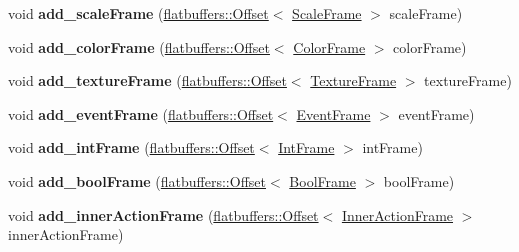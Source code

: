 \begin{DoxyCompactItemize}
\item 
\mbox{\label{structflatbuffers_1_1FrameBuilder_ac62911862ae54604654259b250f62d61}} 
void {\bfseries add\+\_\+scale\+Frame} (\hyperlink{structflatbuffers_1_1Offset}{flatbuffers\+::\+Offset}$<$ \hyperlink{structflatbuffers_1_1ScaleFrame}{Scale\+Frame} $>$ scale\+Frame)
\item 
\mbox{\label{structflatbuffers_1_1FrameBuilder_a201a2fce6152ac142266550904845393}} 
void {\bfseries add\+\_\+color\+Frame} (\hyperlink{structflatbuffers_1_1Offset}{flatbuffers\+::\+Offset}$<$ \hyperlink{structflatbuffers_1_1ColorFrame}{Color\+Frame} $>$ color\+Frame)
\item 
\mbox{\label{structflatbuffers_1_1FrameBuilder_aaef0b8db77626281801f505ec566a8c8}} 
void {\bfseries add\+\_\+texture\+Frame} (\hyperlink{structflatbuffers_1_1Offset}{flatbuffers\+::\+Offset}$<$ \hyperlink{structflatbuffers_1_1TextureFrame}{Texture\+Frame} $>$ texture\+Frame)
\item 
\mbox{\label{structflatbuffers_1_1FrameBuilder_ad7686a0aed58aed9958aa7a26ca192e8}} 
void {\bfseries add\+\_\+event\+Frame} (\hyperlink{structflatbuffers_1_1Offset}{flatbuffers\+::\+Offset}$<$ \hyperlink{structflatbuffers_1_1EventFrame}{Event\+Frame} $>$ event\+Frame)
\item 
\mbox{\label{structflatbuffers_1_1FrameBuilder_ab2f82663283ddeafc40b2dd41c71b15a}} 
void {\bfseries add\+\_\+int\+Frame} (\hyperlink{structflatbuffers_1_1Offset}{flatbuffers\+::\+Offset}$<$ \hyperlink{structflatbuffers_1_1IntFrame}{Int\+Frame} $>$ int\+Frame)
\item 
\mbox{\label{structflatbuffers_1_1FrameBuilder_a8140165f5941b16659951f300524b0aa}} 
void {\bfseries add\+\_\+bool\+Frame} (\hyperlink{structflatbuffers_1_1Offset}{flatbuffers\+::\+Offset}$<$ \hyperlink{structflatbuffers_1_1BoolFrame}{Bool\+Frame} $>$ bool\+Frame)
\item 
\mbox{\label{structflatbuffers_1_1FrameBuilder_ab7cbda0e5e072f6fc510f7ed0fb94c68}} 
void {\bfseries add\+\_\+inner\+Action\+Frame} (\hyperlink{structflatbuffers_1_1Offset}{flatbuffers\+::\+Offset}$<$ \hyperlink{structflatbuffers_1_1InnerActionFrame}{Inner\+Action\+Frame} $>$ inner\+Action\+Frame)

\end{DoxyCompactItemize}
